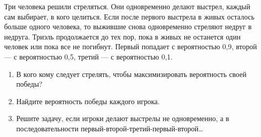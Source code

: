 \begin{problem}[Триэль]
Три человека решили стреляться. Они одновременно делают выстрел, каждый сам выбирает, в кого целиться. Если после первого выстрела в живых осталось больше одного человека, то выжившие снова одновременно стреляют недруг в недруга. Триэль продолжается до тех пор, пока в живых не останется один человек или пока все не погибнут. Первый попадает с вероятностью 0,9, второй  --- с вероятностью 0,5, третий --- с вероятностью 0,1.\par
\begin{enumerate}
\item  В кого кому следует стрелять, чтобы максимизировать вероятность своей победы?\par
\item Найдите вероятность победы каждого игрока.\par
\item  Решите задачу, если игроки делают выстрелы не одновременно, а в последовательности первый-второй-третий-первый-второй\ldots
\end{enumerate}


\begin{sol}

\end{sol}
\end{problem}




